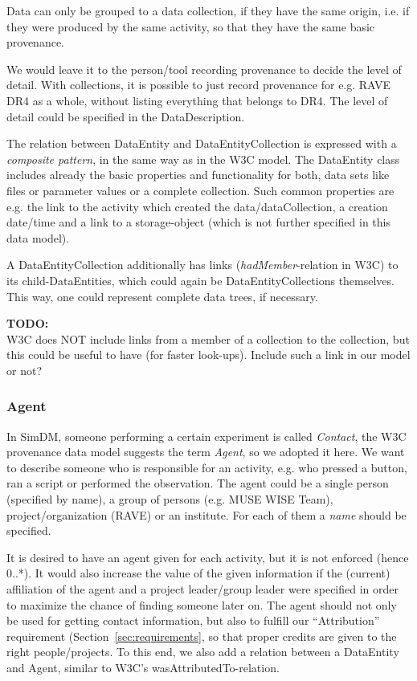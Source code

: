\documentclass[11pt,a4paper]{ivoa}
\newcommand{\TODO}[1]{%
    \noindent%
    \colorbox{todocolor}{%
            \parbox{0.85\linewidth}{\sffamily \textbf{TODO:}\\
            #1}
    }%
    \vspace{2pt}

}
\begin{document}
Data can only be grouped to a data collection, if they have the same origin, i.e. if they were
produced by the same activity, so that they have the same basic provenance.

We would leave it to the person/tool recording provenance to decide the level of detail.
With collections, it is possible to just record provenance for e.g. RAVE DR4 as a 
whole, without listing everything that belongs to DR4. The level of detail could be specified in the  DataDescription.

The relation between DataEntity and DataEntityCollection is expressed with a \emph{composite pattern}, 
in the same way as in the W3C model. The DataEntity class includes already the basic properties and functionality for both, data sets like files or 
parameter values or a complete collection. Such common properties are e.g. the link 
to the activity which created the data/dataCollection, a creation date/time and a link to a
storage-object (which is not further specified in this data model).

A DataEntityCollection additionally has links (\emph{hadMember}-relation in W3C) to its 
child-DataEntities, which could again be DataEntityCollections themselves.
This way, one could represent complete data trees, if necessary.

\TODO{W3C does NOT include links from a member of a collection to the collection, but this could be useful to have (for faster look-ups). Include such a link in our model or not?}


\subsubsection{Agent}
In SimDM, someone performing a certain experiment is called \emph{Contact}, 
the W3C provenance data model suggests the term \emph{Agent}, so we adopted it here.
We want to describe someone who is responsible for an activity, e.g. who pressed a button, 
ran a script or performed the observation. The agent could be a single person 
(specified by name), a group of persons (e.g. MUSE WISE Team), project/organization (RAVE) or an institute. 
For each of them a \emph{name} should be specified.

It is desired to have an agent given for each activity, but it
is not enforced (hence 0..*).  It would also increase the value of the given
information if the (current) affiliation of the agent and a project leader/group
leader were specified in order to maximize the chance of finding someone later
on. The agent should not only be used for getting contact information, but also 
to fulfill our ``Attribution'' requirement (Section~\ref{sec:requirements}, 
so that proper credits are given to the right 
people/projects. To this end, we also add a 
relation between a DataEntity and Agent, similar to W3C's 
wasAttributedTo-relation.
\end{document}
